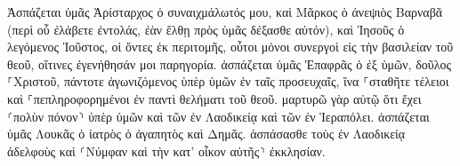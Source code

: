 \documentclass{openreader}
\begin{document}
Ἀσπάζεται ὑμᾶς Ἀρίσταρχος ὁ συναιχμάλωτός μου, καὶ Μᾶρκος ὁ ἀνεψιὸς Βαρναβᾶ (περὶ οὗ ἐλάβετε ἐντολάς, ἐὰν ἔλθῃ πρὸς ὑμᾶς δέξασθε αὐτόν), 
καὶ Ἰησοῦς ὁ λεγόμενος Ἰοῦστος, οἱ ὄντες ἐκ περιτομῆς, οὗτοι μόνοι συνεργοὶ εἰς τὴν βασιλείαν τοῦ θεοῦ, οἵτινες ἐγενήθησάν μοι παρηγορία. 
ἀσπάζεται ὑμᾶς Ἐπαφρᾶς ὁ ἐξ ὑμῶν, δοῦλος ⸀Χριστοῦ, πάντοτε ἀγωνιζόμενος ὑπὲρ ὑμῶν ἐν ταῖς προσευχαῖς, ἵνα ⸀σταθῆτε τέλειοι καὶ ⸀πεπληροφορημένοι ἐν παντὶ θελήματι τοῦ θεοῦ. 
μαρτυρῶ γὰρ αὐτῷ ὅτι ἔχει ⸂πολὺν πόνον⸃ ὑπὲρ ὑμῶν καὶ τῶν ἐν Λαοδικείᾳ καὶ τῶν ἐν Ἱεραπόλει. 
ἀσπάζεται ὑμᾶς Λουκᾶς ὁ ἰατρὸς ὁ ἀγαπητὸς καὶ Δημᾶς. 
ἀσπάσασθε τοὺς ἐν Λαοδικείᾳ ἀδελφοὺς καὶ ⸂Νύμφαν καὶ τὴν κατ’ οἶκον αὐτῆς⸃ ἐκκλησίαν. 
\end{document}
